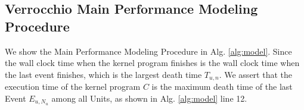 \documentclass[12pt]{extbook}
\begin{document}
\begin{table}[tp]
\caption{Verrocchio hardware parameter definitions of the Ascend 310 processors}
\label{tab:parameter}
\begin{center}

\end{center}
\end{table}

\subsection{Verrocchio Main Performance Modeling Procedure}

We show the Main Performance Modeling Procedure in Alg. \ref{alg:model}. Since the wall clock time when the kernel program finishes is the wall clock time when the last event finishes, which is the largest death time $T_{u, n}$. We assert that the execution time of the kernel program $C$ is the maximum death time of the last Event $E_{u, N_{u}}$ among all Units, as shown in Alg. \ref{alg:model} line 12. 
\end{document}
